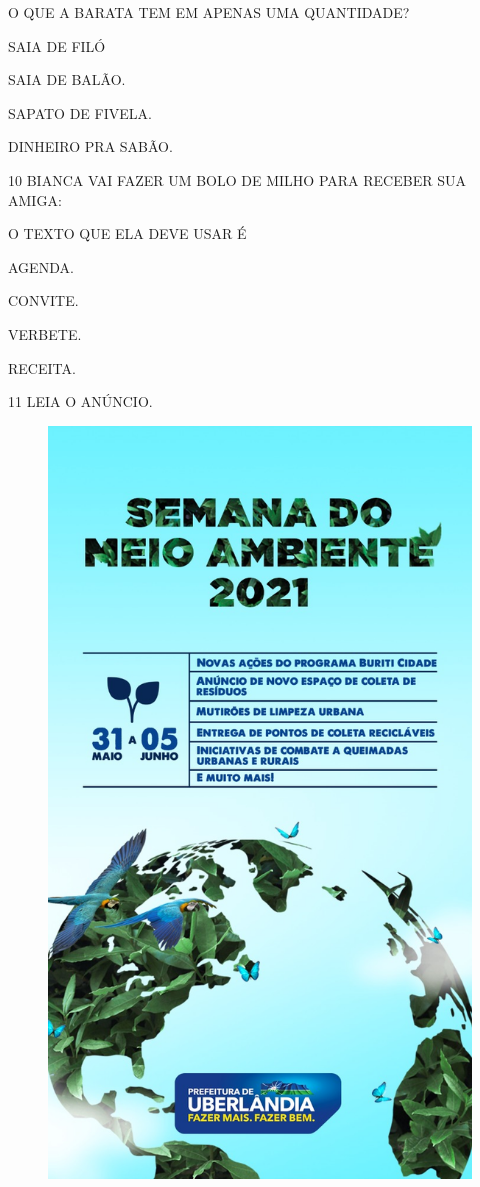 O QUE A BARATA TEM EM APENAS UMA QUANTIDADE?

\begin{escolha}

\item SAIA DE FILÓ

\item SAIA DE BALÃO.

\item SAPATO DE FIVELA.

\item DINHEIRO PRA SABÃO.

\end{escolha}

\num{10} BIANCA VAI FAZER UM BOLO DE MILHO PARA RECEBER SUA AMIGA:

O TEXTO QUE ELA DEVE USAR É

\begin{escolha}

\item AGENDA.

\item CONVITE.

\item VERBETE.

\item RECEITA.

\end{escolha}

\num{11} LEIA O ANÚNCIO.

\begin{figure}[H]
\centering
\includegraphics[width=.6\textwidth]{./media/image218.jpeg}
\end{figure}

